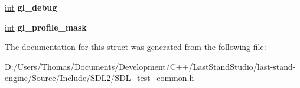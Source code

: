 \begin{DoxyCompactItemize}
\item 
\hypertarget{structSDLTest__CommonState_a2710657ef2a0c8aabebc5fceb01c71b5}{}\hyperlink{SDL__thread_8h_a6a64f9be4433e4de6e2f2f548cf3c08e}{int} {\bfseries gl\+\_\+debug}\label{structSDLTest__CommonState_a2710657ef2a0c8aabebc5fceb01c71b5}

\item 
\hypertarget{structSDLTest__CommonState_aa923ff5f227c35523a4e491863a7d907}{}\hyperlink{SDL__thread_8h_a6a64f9be4433e4de6e2f2f548cf3c08e}{int} {\bfseries gl\+\_\+profile\+\_\+mask}\label{structSDLTest__CommonState_aa923ff5f227c35523a4e491863a7d907}

\end{DoxyCompactItemize}


The documentation for this struct was generated from the following file\+:\begin{DoxyCompactItemize}
\item 
D\+:/\+Users/\+Thomas/\+Documents/\+Development/\+C++/\+Last\+Stand\+Studio/last-\/stand-\/engine/\+Source/\+Include/\+S\+D\+L2/\hyperlink{SDL__test__common_8h}{S\+D\+L\+\_\+test\+\_\+common.\+h}\end{DoxyCompactItemize}
